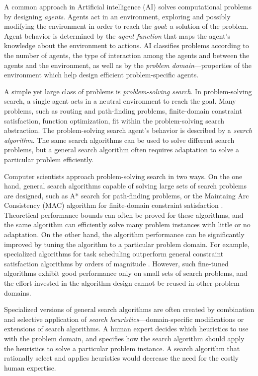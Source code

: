 A common approach in Artificial intelligence (AI)
solves computational problems by designing {\em agents}. Agents
act in an environment, exploring and possibly modifying the
environment in order to reach the {\em goal}: a solution of the
problem. Agent behavior is determined by the {\em agent function} that
maps the agent's knowledge about the environment to actions. AI
classifies problems according to the number of agents, the type of
interaction among the agents and between the agents and the
environment, as well as by the {\em problem domain}---properties of
the environment which help design efficient problem-specific agents.

A simple yet large class of problems is {\em problem-solving
  search}. In problem-solving search, a single agent acts in a neutral
environment to reach the goal. Many problems, such as routing and
path-finding problems, finite-domain constraint satisfaction, function
optimization, fit within the problem-solving search abstraction. The
problem-solving search agent's behavior is described by a {\em search
  algorithm}. The same search algorithms can be used to solve
different search problems, but a general search algorithm often
requires adaptation to solve a particular problem efficiently.

Computer scientists approach problem-solving search in two ways. On
the one hand, general search algorithms capable of solving large sets
of search problems are designed, such as A* search for path-finding
problems, or the Maintaing Arc Consistency (MAC) algorithm for
finite-domain constraint satisfaction \cite{Russell.aima}. Theoretical
performance bounds can often be proved for these algorithms, and the
same algorithm can efficiently solve many problem instances with
little or no adaptation. On the other hand, the algorithm performance
can be significantly improved by tuning the algorithm to a particular
problem domain. For example, specialized algorithms for task
scheduling outperform general constraint satisfaction algorithms by
orders of magnitude \cite{Wolf.scheduling}. However, such fine-tuned
algorithms exhibit good performance only on small sets of search
problems, and the effort invested in the algorithm design cannot be
reused in other problem domains.

Specialized versions of general search algorithms are often created by
combination and selective application of {\em search
  heuristics}---domain-specific modifications or extensions of search
algorithms. A human expert decides which heuristics to use with the
problem domain, and specifies how the search algorithm should apply
the heuristics to solve a particular problem instance. A search
algorithm that rationally select and applies heuristics would decrease
the need for the costly human expertise.

